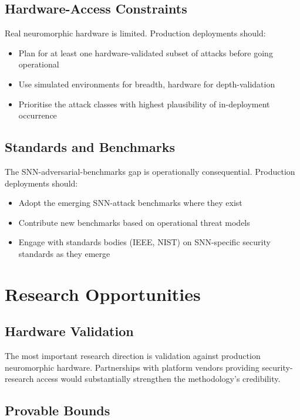 \documentclass[sigconf,nonacm]{acmart}
\begin{document}
\subsection{Hardware-Access Constraints}

Real neuromorphic hardware is limited. Production deployments
should:

\begin{itemize}
  \item Plan for at least one hardware-validated subset of
        attacks before going operational
  \item Use simulated environments for breadth, hardware for
        depth-validation
  \item Prioritise the attack classes with highest plausibility
        of in-deployment occurrence
\end{itemize}

\subsection{Standards and Benchmarks}

The SNN-adversarial-benchmarks gap is operationally consequential.
Production deployments should:

\begin{itemize}
  \item Adopt the emerging SNN-attack benchmarks where they
        exist
  \item Contribute new benchmarks based on operational threat
        models
  \item Engage with standards bodies (IEEE, NIST) on
        SNN-specific security standards as they emerge
\end{itemize}

\section{Research Opportunities}

\subsection{Hardware Validation}

The most important research direction is validation against
production neuromorphic hardware. Partnerships with platform
vendors providing security-research access would substantially
strengthen the methodology's credibility.

\subsection{Provable Bounds}
\end{document}
